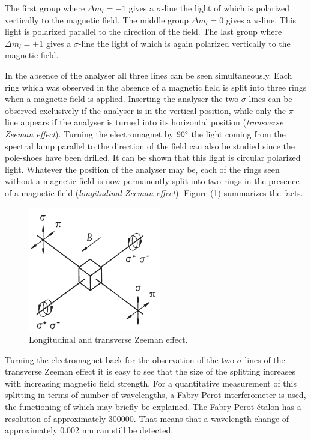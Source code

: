 \documentclass[%
 reprint,
nofootinbib,
 amsmath,amssymb,
 aps,
floatfix,
]{revtex4-2}
\begin{document}
    \par
    The first group where $\Delta m_l = -1$ gives a $\sigma$-line the light of which is polarized vertically to the magnetic field. The middle group $\Delta m_l = 0$ gives a $\pi$-line. This light is polarized parallel to the direction of the field. The last group where $\Delta m_l = +1$ gives a $\sigma$-line the light of which is again polarized vertically to the magnetic field.
    \par
    In the absence of the analyser all three lines can be seen simultaneously. Each ring which was observed in the absence of a magnetic field is split into three rings when a magnetic field is applied. Inserting the analyser the two $\sigma$-lines can be observed exclusively if the analyser is in the vertical position, while only the $\pi$-line appears if the analyser is turned into its horizontal position (\textit{transverse Zeeman effect}). Turning the electromagnet by $90 \degree$ the light coming from the spectral lamp parallel to the direction of the field can also be studied since the pole-shoes have been drilled. It can be shown that this light is circular polarized light. Whatever the position of the analyser may be, each of the rings seen without a magnetic field is now permanently split into two rings in the presence of a magnetic field (\textit{longitudinal Zeeman effect}). Figure (\ref{fig:long}) summarizes the facts.
    \begin{figure}
        \centering
        \includegraphics{Figures/longtranszeeman.png}
        \caption{Longitudinal and transverse Zeeman effect.}
        \label{fig:long}
    \end{figure}
    Turning the electromagnet back for the observation of the two $\sigma$-lines of the transverse Zeeman effect it is easy to see that the size of the splitting increases with increasing magnetic field strength. For a quantitative measurement of this splitting in terms of number of wavelengths, a Fabry-Perot interferometer is used, the functioning of which may briefly be explained. The Fabry-Perot étalon has a resolution of approximately 300000. That means that a wavelength change of approximately 0.002 nm can still be detected.
\end{document}
